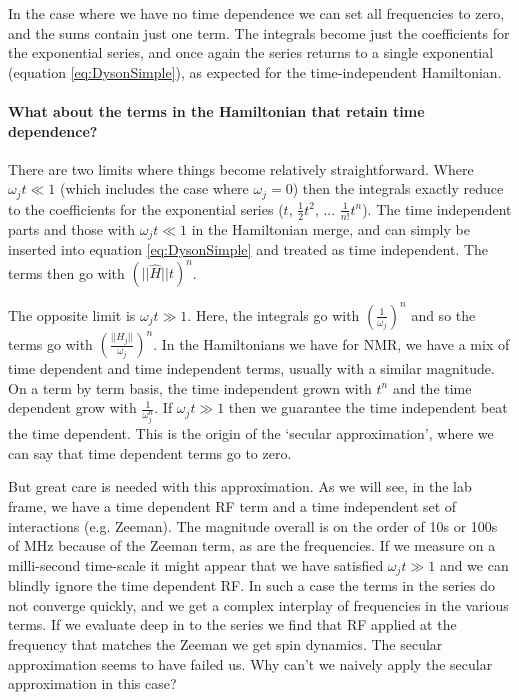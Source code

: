\documentclass[notitlepage,11pt]{article}
\begin{document}
In the case where we have no time dependence we can set all frequencies to zero, and the sums contain just one term. The integrals become just the coefficients for the exponential series, and once again the series returns to a single exponential (equation \ref{eq:DysonSimple}), as expected for the time-independent Hamiltonian.

\paragraph{What about the terms in the Hamiltonian that retain time dependence?}

There are two limits where things become relatively straightforward. Where $\omega_j t \ll 1$ (which includes the case where $\omega_j=0$) then the integrals exactly reduce to the coefficients for the exponential series ($t$, $\frac{1}{2}t^2$, ... $\frac{1}{n!}t^n$). The time independent parts and those with  $\omega_j t \ll 1$ in the Hamiltonian merge, and can simply be inserted into equation \ref{eq:DysonSimple} and treated as time independent. The terms then go with $(||\hat{H}||t)^n$.

The opposite limit is $\omega_j t \gg 1$. Here, the integrals go with $(\frac{1}{\omega_j})^n$ and so the terms go with $\left(\frac{||H_j||}{\omega_j}\right)^n$. In the Hamiltonians we have for NMR, we have a mix of time dependent and time independent terms, usually with a similar magnitude. On a term by term basis, the time independent grown with $t^n$ and the time dependent grow with $\frac{1}{\omega_j^n}$. If $\omega_j t \gg 1$ then we guarantee the time independent beat the time dependent. This is the origin of the `secular approximation', where we can say that time dependent terms go to zero.

But great care is needed with this approximation. As we will see, in the lab frame, we have a time dependent RF term and a time independent set of interactions (e.g. Zeeman). The magnitude overall is on the order of 10s or 100s of MHz because of the Zeeman term, as are the frequencies. If we measure on a milli-second time-scale it might appear that we have satisfied $\omega_j t \gg 1$ and we can blindly ignore the time dependent RF. In such a case the terms in the series do not converge quickly, and we get a complex interplay of frequencies in the various terms. If we evaluate deep in to the series we find that RF applied at the frequency that matches the Zeeman we get spin dynamics. The secular approximation seems to have failed us.  Why can't we naively apply the secular approximation in this case?
\end{document}
